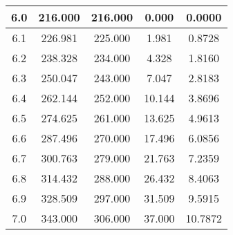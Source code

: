 \begin{table}[h!]
\begin{tabular}{|c|c|c|c|c|}
        6.0        & 216.000        & 216.000            & 0.000         & 0.0000                \\ \hline
        6.1        & 226.981        & 225.000            & 1.981         & 0.8728                \\ \hline
        6.2        & 238.328        & 234.000            & 4.328         & 1.8160                \\ \hline
        6.3        & 250.047        & 243.000            & 7.047         & 2.8183                \\ \hline
        6.4        & 262.144        & 252.000            & 10.144        & 3.8696                \\ \hline
        6.5        & 274.625        & 261.000            & 13.625        & 4.9613                \\ \hline
        6.6        & 287.496        & 270.000            & 17.496        & 6.0856                \\ \hline
        6.7        & 300.763        & 279.000            & 21.763        & 7.2359                \\ \hline
        6.8        & 314.432        & 288.000            & 26.432        & 8.4063                \\ \hline
        6.9        & 328.509        & 297.000            & 31.509        & 9.5915                \\ \hline
        7.0        & 343.000        & 306.000            & 37.000        & 10.7872               \\ \hline
    \end{tabular}\label{tab:table4}
\end{table}
